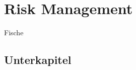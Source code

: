 
\section{Risk Management}
\label{sec:theoryA}
Fische \cite{WetterAktuellWettervorhersage2019}

\subsection{Unterkapitel}
\label{sec:theoryAa}


